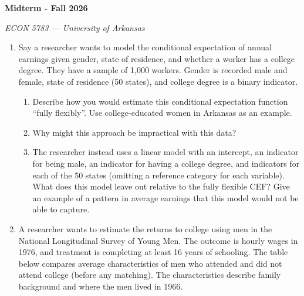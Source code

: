 \documentclass[12pt]{article}
\begin{document}
\begin{center}
  {\Huge\bf Midterm - Fall 2026}

  \smallskip
  {\large\it ECON 5783 — University of Arkansas}
\end{center}

\medskip
\begin{enumerate}
  \item Say a researcher wants to model the conditional expectation of annual earnings given gender, state of residence, and whether a worker has a college degree.
  They have a sample of 1,000 workers.
  Gender is recorded male and female, state of residence (50 states), and college degree is a binary indicator.
  \begin{enumerate}[label=(\alph*)]
    \item Describe how you would estimate this conditional expectation function ``fully flexibly''. 
    Use college-educated women in Arkansas as an example.

    \item Why might this approach be impractical with this data?

    \item The researcher instead uses a linear model with an intercept, an indicator for being male, an indicator for having a college degree, and indicators for each of the 50 states (omitting a reference category for each variable).
    What does this model leave out relative to the fully flexible CEF?
    Give an example of a pattern in average earnings that this model would not be able to capture.
  \end{enumerate}

  \newpage
  \item A researcher wants to estimate the returns to college using men in the National Longitudinal Survey of Young Men.
  The outcome is hourly wages in 1976, and treatment is completing at least 16 years of schooling.
  The table below compares average characteristics of men who attended and did not attend college (before any matching).
  The characteristics describe family background and where the men lived in 1966.


\end{enumerate}
\end{document}
